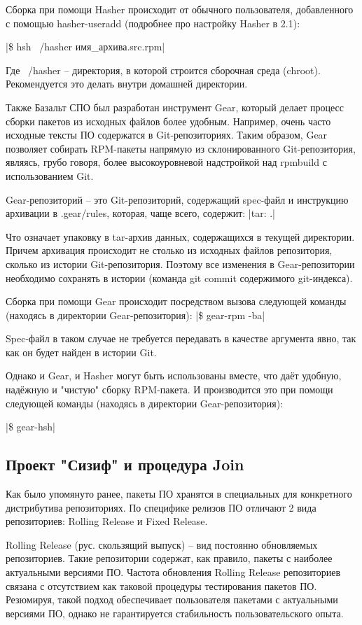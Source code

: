 \documentclass[bachelor, och, pract]{SCWorks}
\begin{document}
Сборка при помощи Hasher происходит от обычного пользователя, добавленного с помощью hasher-useradd (подробнее про настройку Hasher в 2.1):

|\$ hsh ~/hasher имя_архива.src.rpm| %

Где ~/hasher -- директория, в которой строится сборочная среда (chroot). Рекомендуется это делать внутри домашней директории.

Также Базальт СПО был разработан инструмент Gear, который делает процесс сборки пакетов из исходных файлов более удобным. 
Например, очень часто исходные тексты ПО содержатся в Git-репозиториях.
Таким образом, Gear позволяет собирать RPM-пакеты напрямую из склонированного Git-репозитория, являясь, грубо говоря, более высокоуровневой надстройкой над rpmbuild с использованием Git.

Gear-репозиторий -- это Git-репозиторий, содержащий spec-файл и инструкцию архивации в .gear/rules, которая, чаще всего, содержит:
|tar: .|

Что означает упаковку в tar-архив данных, содержащихся в текущей директории.
Причем архивация происходит не столько из исходных файлов репозитория, сколько из истории Git-репозитория. 
Поэтому все изменения в Gear-репозитории необходимо сохранять в истории (команда git commit содержимого git-индекса).

Сборка при помощи Gear происходит посредством вызова следующей команды (находясь в директории Gear-репозитория):
|\$ gear-rpm -ba|

Spec-файл в таком случае не требуется передавать в качестве аргумента явно, так как он будет найден в истории Git.

Однако и Gear, и Hasher могут быть использованы вместе, что даёт удобную, надёжную и "чистую" сборку RPM-пакета.
И производится это при помощи следующей команды (находясь в директории Gear-репозитория):

|\$ gear-hsh|

\subsection{Проект "Сизиф" и процедура Join}
Как было упомянуто ранее, пакеты ПО хранятся в специальных для конкретного дистрибутива репозиториях.
По специфике релизов ПО отличают 2 вида репозиториев: Rolling Release и Fixed Release.

Rolling Release (рус. скользящий выпуск) -- вид постоянно обновляемых репозиториев.
Такие репозитории содержат, как правило, пакеты с наиболее актуальными версиями ПО.
Частота обновления Rolling Release репозиториев связана с отсутствием как таковой процедуры тестирования пакетов ПО.
Резюмируя, такой подход обеспечивает пользователя пакетами с актуальными версиями ПО, однако не гарантируется стабильность пользовательского опыта.
\end{document}
